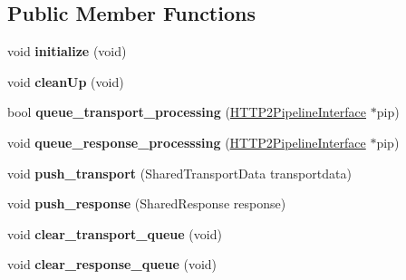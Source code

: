 \subsection*{Public Member Functions}
\begin{DoxyCompactItemize}
\item 
\mbox{\label{classhttp2_1_1HTTP2TransportQueue_ae7d5da235921626c65d481432551ef42}} 
void {\bfseries initialize} (void)
\item 
\mbox{\label{classhttp2_1_1HTTP2TransportQueue_a4dc6c5766f8156d93d5067a3c725a9cf}} 
void {\bfseries clean\+Up} (void)
\item 
\mbox{\label{classhttp2_1_1HTTP2TransportQueue_a3d7a941c838043d7111076ce6a6c427e}} 
bool {\bfseries queue\+\_\+transport\+\_\+processing} (\hyperlink{classhttp2_1_1HTTP2PipelineInterface}{H\+T\+T\+P2\+Pipeline\+Interface} $\ast$pip)
\item 
\mbox{\label{classhttp2_1_1HTTP2TransportQueue_a2292a221a4a82ea007348bd6aea1a1d0}} 
void {\bfseries queue\+\_\+response\+\_\+processsing} (\hyperlink{classhttp2_1_1HTTP2PipelineInterface}{H\+T\+T\+P2\+Pipeline\+Interface} $\ast$pip)
\item 
\mbox{\label{classhttp2_1_1HTTP2TransportQueue_a3aea18458c80573b97205710b93ef02e}} 
void {\bfseries push\+\_\+transport} (Shared\+Transport\+Data transportdata)
\item 
\mbox{\label{classhttp2_1_1HTTP2TransportQueue_aabaabc36eab95931575a2e41bb86250a}} 
void {\bfseries push\+\_\+response} (Shared\+Response response)
\item 
\mbox{\label{classhttp2_1_1HTTP2TransportQueue_aa9bebd8b75513c55aad91bef438aaae1}} 
void {\bfseries clear\+\_\+transport\+\_\+queue} (void)
\item 
\mbox{\label{classhttp2_1_1HTTP2TransportQueue_ac49196a197873ca53b160e3ab727de49}} 
void {\bfseries clear\+\_\+response\+\_\+queue} (void)
\end{DoxyCompactItemize}
